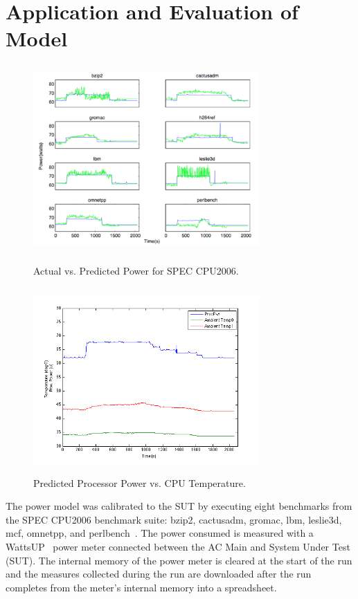 \documentclass[times, 10pt, finalversion]{usetex-v1}
\begin{document}
\section{Application and Evaluation of Model}
\label{sec:experiment}
\begin{figure}
  \begin{minipage}[b]{0.5\linewidth}
      \centering
      \includegraphics[width=3.4in,height=2.8in]{geomean.pdf}
      \caption{Actual vs. Predicted Power for SPEC CPU2006.}
      \label{fig:geomean}
  \end{minipage}
  \begin{minipage}[b]{0.5\linewidth}
      \centering
      \includegraphics[width=3.4in,height=2.8in]{ppwrcputemp.png}
      \caption{Predicted Processor Power vs. CPU Temperature.}
      \label{fig:ppwrcputemp}
  \end{minipage}
\end{figure}
The power model was calibrated to the SUT by executing eight benchmarks
from the SPEC CPU2006 benchmark suite: bzip2, cactusadm, gromac, lbm,
leslie3d, mcf, omnetpp, and perlbench~\cite{Henning2006}.  The power consumed is measured
with a WattsUP~\cite{WattsUp2006a} power meter connected between the AC
Main and System Under Test (SUT).  The internal memory of the power
meter is cleared at the start of the run and the measures collected
during the run are downloaded after the run completes from the meter's
internal memory into a spreadsheet.
\end{document}
